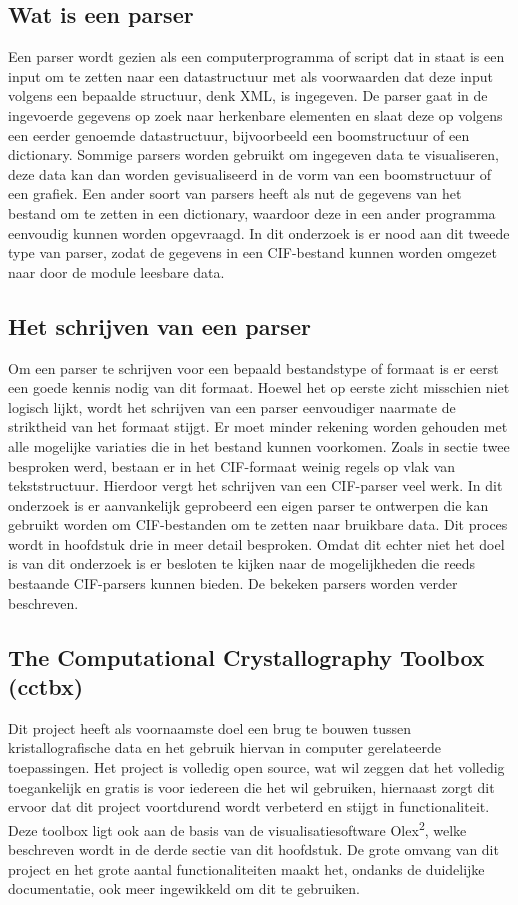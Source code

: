 \subsection{Wat is een parser}
Een parser wordt gezien als een computerprogramma of script dat in staat is een input om te zetten naar een datastructuur met als voorwaarden dat deze input volgens een bepaalde structuur, denk XML, is ingegeven. De parser gaat in de ingevoerde gegevens op zoek naar herkenbare elementen en slaat deze op volgens een eerder genoemde datastructuur, bijvoorbeeld een boomstructuur of een dictionary. Sommige parsers worden gebruikt om ingegeven data te visualiseren, deze data kan dan worden gevisualiseerd in de vorm van een boomstructuur of een grafiek. Een ander soort van parsers heeft als nut de gegevens van het bestand om te zetten in een dictionary, waardoor deze in een ander programma eenvoudig kunnen worden opgevraagd. In dit onderzoek is er nood aan dit tweede type van parser, zodat de gegevens in een CIF-bestand kunnen worden omgezet naar door de module leesbare data. 

\par
\subsection{Het schrijven van een parser}
Om een parser te schrijven voor een bepaald bestandstype of formaat is er eerst een goede kennis nodig van dit formaat. Hoewel het op eerste zicht misschien niet logisch lijkt, wordt het schrijven van een parser eenvoudiger naarmate de striktheid van het formaat stijgt. Er moet minder rekening worden gehouden met alle mogelijke variaties die in het bestand kunnen voorkomen. Zoals in sectie twee besproken werd, bestaan er in het CIF-formaat weinig regels op vlak van tekststructuur. Hierdoor vergt het schrijven van een CIF-parser veel werk. In dit onderzoek is er aanvankelijk geprobeerd een eigen parser te ontwerpen die kan gebruikt worden om CIF-bestanden om te zetten naar bruikbare data. Dit proces wordt in hoofdstuk drie in meer detail besproken. Omdat dit echter niet het doel is van dit onderzoek is er besloten te kijken naar de mogelijkheden die reeds bestaande CIF-parsers kunnen bieden. De bekeken parsers worden verder beschreven.  

\par
\subsection{The Computational Crystallography Toolbox (cctbx)}
Dit project heeft als voornaamste doel een brug te bouwen tussen kristallografische data en het gebruik hiervan in computer gerelateerde toepassingen. Het project is volledig open source, wat wil zeggen dat het volledig toegankelijk en gratis is voor iedereen die het wil gebruiken, hiernaast zorgt dit ervoor dat dit project voortdurend wordt verbeterd en stijgt in functionaliteit. Deze toolbox ligt ook aan de basis van de visualisatiesoftware Olex\textsuperscript{2}, welke beschreven wordt in de derde sectie van dit hoofdstuk. De grote omvang van dit project en het grote aantal functionaliteiten maakt het, ondanks de duidelijke documentatie, ook meer ingewikkeld om dit te gebruiken. 

